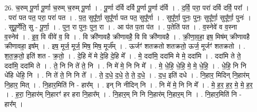 \documentclass[17pt]{extarticle}
\begin{document}
26. च॒रुम् पू॒र्णा पू॒र्णा च॒रुम् च॒रुम् पू॒र्णा । . पू॒र्णा द॑र्वि दर्वि पू॒र्णा पू॒र्णा द॑र्वि । . द॒र्वि॒ परा॒ परा॑ दर्वि दर्वि॒ परा᳚ । . परा॑ पत पत॒ परा॒ परा॑ पत । . प॒त॒ सुपू᳚र्णा॒ सुपू᳚र्णा पत पत॒ सुपू᳚र्णा । . सुपू᳚र्णा॒ पुनः॒ पुनः॒ सुपू᳚र्णा॒ सुपू᳚र्णा॒ पुनः॑ । . सुपू॒र्णेति॒ सु - पू॒र्णा॒ । . पुन॒ रा पुनः॒ पुन॒ रा । . आ प॑त प॒ता प॑त । . प॒तेति॑ पत । . व॒स्नेवे॑ व व॒स्ना व॒स्नेव॑ । . इ॒व॒ वि वीवे॑ व॒ वि । . वि क्री॑णावहै क्रीणावहै॒ वि वि क्री॑णावहै । . क्री॒णा॒व॒हा॒ इष॒ मिष॑म् क्रीणावहै क्रीणावहा॒ इष᳚म् । . इष॒ मूर्ज॒ मूर्ज॒ मिष॒ मिष॒ मूर्ज᳚म् । . ऊर्जꣳ॑ शतक्रतो शतक्रतो॒ ऊर्ज॒ मूर्जꣳ॑ शतक्रतो । . श॒त॒क्र॒तो॒ इति॑ शत - क्र॒तो॒ । . दे॒हि मे॑ मे दे॒हि दे॒हि मे᳚ । . मे॒ ददा॑मि॒ ददा॑मि मे मे॒ ददा॑मि । . ददा॑मि ते ते॒ ददा॑मि॒ ददा॑मि ते । . ते॒ नि नि ते॑ ते॒ नि । . नि मे॑ मे॒ नि नि मे᳚ । . मे॒ धे॒हि॒ धे॒हि॒ मे॒ मे॒ धे॒हि॒ । . धे॒हि॒ नि नि धे॑हि धेहि॒ नि । . नि ते॑ ते॒ नि नि ते᳚ । . ते॒ द॒धे॒ द॒धे॒ ते॒ ते॒ द॒धे॒ । . द॒ध॒ इति॑ दधे । . नि॒हार॒ मिदिन् नि॒हार॑म् नि॒हार॒ मित् । . नि॒हार॒मिति॑ नि - हार᳚म् । . इन् नि नीदिन् नि । . नि मे॑ मे॒ नि नि मे᳚ । . मे॒ ह॒र॒ ह॒र॒ मे॒ मे॒ ह॒र॒ । . ह॒रा॒ नि॒हार॑म् नि॒हारꣳ॑ हर हरा नि॒हार᳚म् । . नि॒हार॒म् नि नि नि॒हार॑म् नि॒हार॒म् नि । . नि॒हार॒मिति॑ नि - हार᳚म् । \newline
\end{document}

